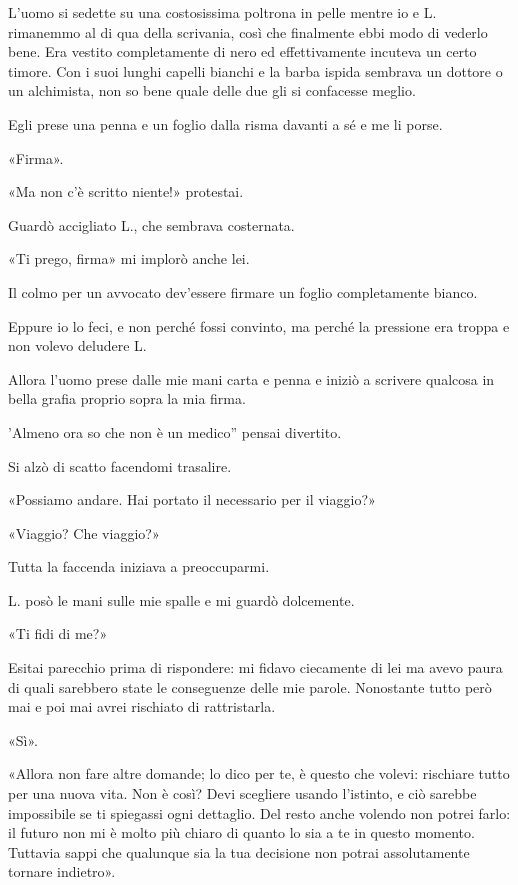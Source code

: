 \documentclass[a4paper,12pt]{book}
\begin{document}
L'uomo si sedette su una costosissima poltrona in pelle mentre io e L.
rimanemmo al di qua della scrivania, così che finalmente ebbi modo di vederlo
bene. Era vestito completamente di nero ed effettivamente incuteva un certo
timore. Con i suoi lunghi capelli bianchi e la barba ispida sembrava un dottore
o un alchimista, non so bene quale delle due gli si confacesse meglio.

Egli prese una penna e un foglio dalla risma davanti a sé e me li porse.

«Firma».

«Ma non c'è scritto niente!» protestai.

Guardò accigliato L., che sembrava costernata.

«Ti prego, firma» mi implorò anche lei.

Il colmo per un avvocato dev'essere firmare un foglio completamente bianco.

Eppure io lo feci, e non perché fossi convinto, ma perché la pressione era
troppa e non volevo deludere L.

Allora l'uomo prese dalle mie mani carta e penna e iniziò a scrivere qualcosa in
bella grafia proprio sopra la mia firma.

'Almeno ora so che non è un medico'' pensai divertito.

Si alzò di scatto facendomi trasalire.

«Possiamo andare. Hai portato il necessario per il viaggio?»

«Viaggio? Che viaggio?»

Tutta la faccenda iniziava a preoccuparmi.

L. posò le mani sulle mie spalle e mi guardò dolcemente.

«Ti fidi di me?»

Esitai parecchio prima di rispondere: mi fidavo ciecamente di lei ma avevo
paura di quali sarebbero state le conseguenze delle mie parole. Nonostante
tutto però mai e poi mai avrei rischiato di rattristarla.

«Sì».

«Allora non fare altre domande; lo dico per te, è questo che volevi: rischiare
tutto per una nuova vita. Non è così? Devi scegliere usando l'istinto, e
ciò sarebbe impossibile se ti spiegassi ogni dettaglio. Del resto anche
volendo non potrei farlo: il futuro non mi è molto più chiaro di quanto lo
sia a te in questo momento. Tuttavia sappi che qualunque sia la tua decisione
non potrai assolutamente tornare indietro».
\end{document}
